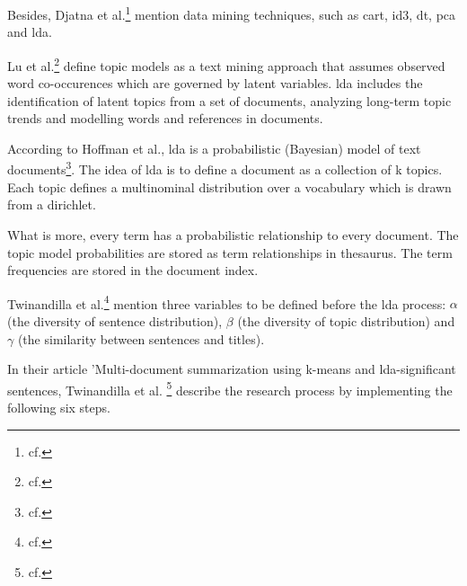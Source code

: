 Besides, Djatna et al.\footnote{cf.\autocite{djatna_2018}} mention data mining techniques, such as \gls{cart}, \gls{id3}, \gls{dt}, \gls{pca} and \gls{lda}. 

Lu et al.\footnote{cf.\autocite{lu_2016}} define topic models as a text mining approach that assumes observed word co-occurences which are governed by latent variables. \gls{lda} includes the identification of latent topics from a set of documents, analyzing long-term topic trends and modelling words and references in documents.   

According to Hoffman et al., \gls{lda} is a probabilistic (Bayesian) model of text documents\footnote{cf.\autocite{hoffman_2010}}. The idea of \gls{lda} is to define a document as a collection of k topics. Each topic defines a multinominal distribution over a vocabulary which is drawn from a dirichlet.

What is more, every term has a probabilistic relationship to every document. The topic model probabilities are stored as term relationships in thesaurus. The term frequencies are stored in the document index.

Twinandilla et al.\footnote{cf.\autocite{twinandilla_2018}} mention three variables to be defined before the \gls{lda} process: $\alpha$ (the diversity of sentence distribution), $\beta$ (the diversity of topic distribution) and $\gamma$ (the similarity between sentences and titles).

In their article 'Multi-document summarization using k-means and \gls{lda}-significant sentences, Twinandilla et al. \footnote{cf.\autocite{twinandilla_2018}} describe the research process by implementing the following six steps.

